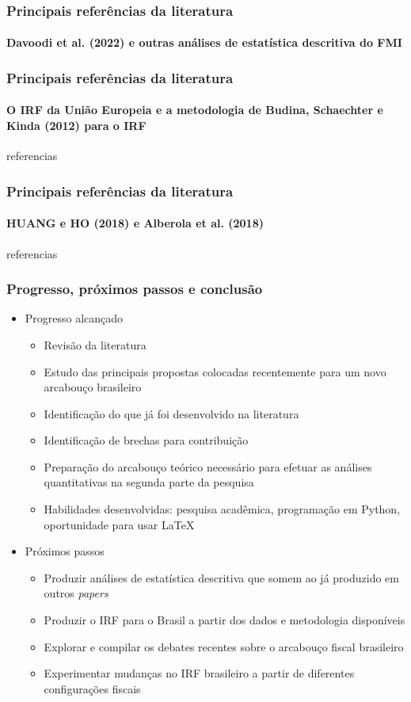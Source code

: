 \documentclass{beamer}
\begin{document}
\begin{frame}
\frametitle{Principais referências da literatura}
\framesubtitle{Davoodi et al. (2022) e outras análises de estatística descritiva do FMI}
    
\end{frame}

\begin{frame}
\frametitle{Principais referências da literatura}
\framesubtitle{O IRF da União Europeia e a metodologia de Budina, Schaechter e Kinda (2012) para o IRF}

referencias
    
\end{frame}

\begin{frame}
\frametitle{Principais referências da literatura}
\framesubtitle{HUANG e HO (2018) e Alberola et al. (2018) }

referencias
    
\end{frame}
\begin{frame}
\frametitle{Progresso, próximos passos e conclusão}
\begin{itemize}
    \item \justifying Progresso alcançado
    \begin{itemize}
        \item Revisão da literatura
        \item Estudo das principais propostas colocadas recentemente para um novo arcabouço brasileiro
        \item Identificação do que já foi desenvolvido na literatura
        \item Identificação de brechas para contribuição
        \item Preparação do arcabouço teórico necessário para efetuar as análises quantitativas na segunda parte da pesquisa
        \item Habilidades desenvolvidas: pesquisa acadêmica, programação em Python, oportunidade para usar \LaTeX
    \end{itemize}
    \item Próximos passos
    \begin{itemize}
        \item Produzir análises de estatística descritiva que somem ao já produzido em outros \emph{papers}
        \item Produzir o IRF para o Brasil a partir dos dados e metodologia disponíveis
        \item Explorar e compilar os debates recentes sobre o arcabouço fiscal brasileiro
        \item Experimentar mudanças no IRF brasileiro a partir de diferentes configurações fiscais
  
    \end{itemize}
\end{itemize}

    
\end{frame}
\end{document}
